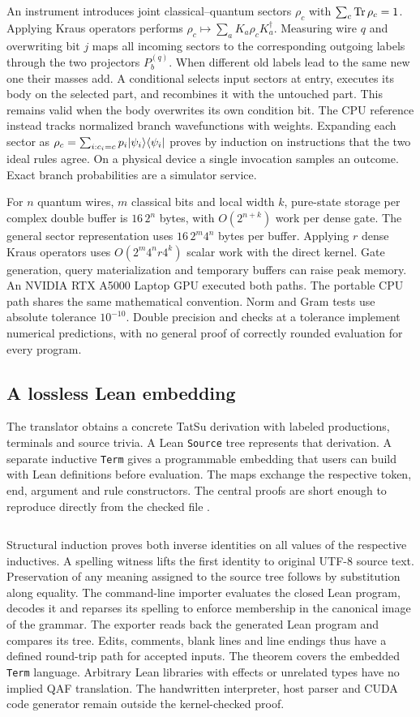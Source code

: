 An instrument introduces joint classical--quantum sectors $\rho_c$ with $\sum_c\operatorname{Tr}\rho_c=1$. Applying Kraus operators performs $\rho_c\mapsto\sum_a K_a\rho_c K_a^\dagger$. Measuring wire $q$ and overwriting bit $j$ maps all incoming sectors to the corresponding outgoing labels through the two projectors $P_b^{(q)}$. When different old labels lead to the same new one their masses add. A conditional selects input sectors at entry, executes its body on the selected part, and recombines it with the untouched part. This remains valid when the body overwrites its own condition bit. The CPU reference instead tracks normalized branch wavefunctions with weights. Expanding each sector as $\rho_c=\sum_{i:c_i=c}p_i\lvert \psi_i\rangle\langle \psi_i\rvert$ proves by induction on instructions that the two ideal rules agree. On a physical device a single invocation samples an outcome. Exact branch probabilities are a simulator service.

For $n$ quantum wires, $m$ classical bits and local width $k$, pure-state storage per complex double buffer is $16\,2^n$ bytes, with $O(2^{n+k})$ work per dense gate. The general sector representation uses $16\,2^m4^n$ bytes per buffer. Applying $r$ dense Kraus operators uses $O(2^m4^n r4^k)$ scalar work with the direct kernel. Gate generation, query materialization and temporary buffers can raise peak memory. An NVIDIA RTX A5000 Laptop GPU executed both paths. The portable CPU path shares the same mathematical convention. Norm and Gram tests use absolute tolerance $10^{-10}$. Double precision and checks at a tolerance implement numerical predictions, with no general proof of correctly rounded evaluation for every program.

\subsection{A lossless Lean embedding}
The translator obtains a concrete TatSu derivation with labeled productions, terminals and source trivia. A Lean \texttt{Source} tree represents that derivation. A separate inductive \texttt{Term} gives a programmable embedding that users can build with Lean definitions before evaluation. The maps exchange the respective token, end, argument and rule constructors. The central proofs are short enough to reproduce directly from the checked file \cite{lean}.
\inputminted[firstline=34,lastline=38,fontsize=\footnotesize]{lean4}{../../src/qaf/lean/QAF.lean}
Structural induction proves both inverse identities on all values of the respective inductives. A spelling witness lifts the first identity to original UTF-8 source text. Preservation of any meaning assigned to the source tree follows by substitution along equality. The command-line importer evaluates the closed Lean program, decodes it and reparses its spelling to enforce membership in the canonical image of the grammar. The exporter reads back the generated Lean program and compares its tree. Edits, comments, blank lines and line endings thus have a defined round-trip path for accepted inputs. The theorem covers the embedded \texttt{Term} language. Arbitrary Lean libraries with effects or unrelated types have no implied QAF translation. The handwritten interpreter, host parser and CUDA code generator remain outside the kernel-checked proof.

